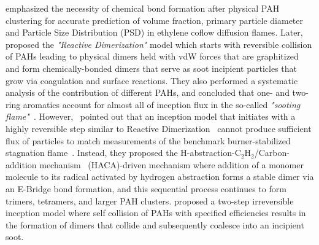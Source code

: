 
\citet{kholghy2019role} emphasized the necessity of chemical bond formation after physical PAH clustering for accurate prediction of volume fraction, primary particle diameter and Particle Size Distribution (PSD) in ethylene coflow diffusion flames. Later,~\citet{kholghy2018reactive} proposed the \textit{"Reactive Dimerization"} model which starts with reversible collision of PAHs leading to physical dimers held with vdW forces that are graphitized and form chemically-bonded dimers that serve as soot incipient particles that grow via  coagulation and surface reactions. They also performed a systematic analysis of the contribution of different PAHs, and concluded that one- and two-ring aromatics account for almost all of inception flux in the so-called \textit{"sooting flame"}~\citep{desgroux2017comparative}. However,~\citet{frenklach2020mechanism} pointed out that an inception model that initiates with a highly reversible step similar to Reactive Dimerization~\citep{kholghy2018reactive} cannot produce sufficient flux of particles to match measurements of the benchmark burner-stabilized stagnation flame~\citep{abid2009quantitative}. Instead, they proposed the H-abstraction-$\mathrm{C_2H_2}$/Carbon-addition  mechanism~\citep{frenklach1991detailed, appel2000kinetic} (HACA)-driven mechanism where addition of a monomer molecule to its radical activated by hydrogen abstraction forms a stable dimer via an E-Bridge bond formation, and this sequential process continues to form trimers, tetramers, and larger PAH clusters. \citet{blanquart2009joint} proposed a two-step irreversible inception model where self collision of PAHs with specified efficiencies results in the formation of dimers that collide and subsequently coalesce into an incipient soot.

